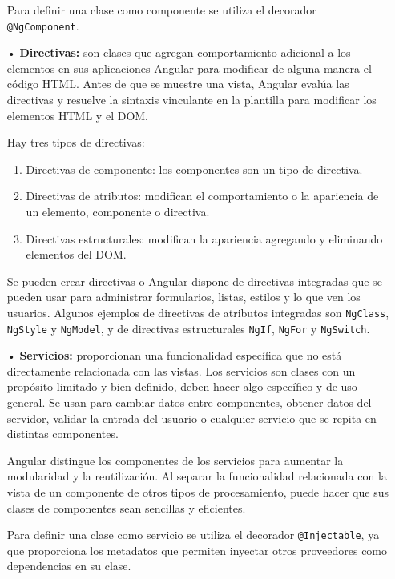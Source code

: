 \documentclass[a4paper, 12pt]{book}
\begin{document}
\begin{itemize}
	Para definir una clase como componente se utiliza el decorador \texttt{@NgComponent}.
	
	\item[•] \textbf{Directivas:} son clases que agregan comportamiento adicional a los elementos en sus aplicaciones Angular para modificar de alguna manera el código HTML. 
	Antes de que se muestre una vista, Angular evalúa las directivas y resuelve la sintaxis vinculante en la plantilla para modificar los elementos HTML y el DOM.
	
	Hay tres tipos de directivas:
	
	\begin{enumerate}
	\item Directivas de componente: los componentes son un tipo de directiva.
	\item Directivas de atributos: modifican el comportamiento o la apariencia de un elemento, componente o directiva.
	\item Directivas estructurales: modifican la apariencia agregando y eliminando elementos del DOM.
	\end{enumerate}
	
	Se pueden crear directivas o Angular dispone de directivas integradas que se pueden usar para administrar formularios, listas, estilos y lo que ven los usuarios. 
	Algunos ejemplos de directivas de atributos integradas son \texttt{NgClass}, \texttt{NgStyle} y \texttt{NgModel}, y de directivas estructurales \texttt{NgIf}, \texttt{NgFor} y \texttt{NgSwitch}.
	
	\item[•] \textbf{Servicios:} proporcionan una funcionalidad específica que no está directamente relacionada con las vistas. Los servicios son clases con un propósito limitado y bien definido, deben hacer algo específico y de uso general. 
	Se usan para cambiar datos entre componentes, obtener datos del servidor, validar la entrada del usuario o cualquier servicio que se repita en distintas componentes.
	
	Angular distingue los componentes de los servicios para aumentar la modularidad y la reutilización. 
	Al separar la funcionalidad relacionada con la vista de un componente de otros tipos de procesamiento, puede hacer que sus clases de componentes sean sencillas y eficientes.
	
	Para definir una clase como servicio se utiliza el decorador \texttt{@Injectable}, ya que proporciona los metadatos que permiten inyectar otros proveedores como dependencias en su clase.
	
\end{itemize}
\end{document}
